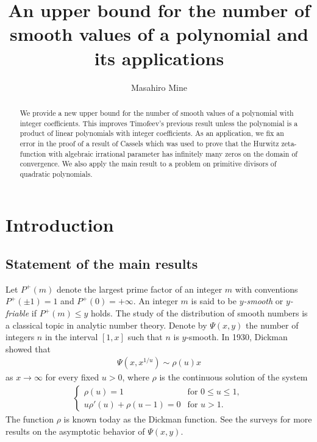 \documentclass[a4paper,11pt]{amsart}
\theoremstyle{definition}
\numberwithin{equation}{section}
\begin{document}
\title[Upper bound for the number of smooth values of a polynomial]
{An upper bound for the number of smooth values of a polynomial and its applications}

\author[M. Mine]{Masahiro Mine}
\address{Global Education Center\\ Waseda University\\
1-6-1 Nishiwaseda, Shinjuku-ku, Tokyo 169-8050, Japan}

\date{}

\begin{abstract}
We provide a new upper bound for the number of smooth values of a polynomial with integer coefficients. 
This improves Timofeev's previous result unless the polynomial is a product of linear polynomials with integer coefficients. 
As an application, we fix an error in the proof of a result of Cassels which was used to prove that the Hurwitz zeta-function with algebraic irrational parameter has infinitely many zeros on the domain of convergence. 
We also apply the main result to a problem on primitive divisors of quadratic polynomials. 
\end{abstract}



\maketitle

\section{Introduction}\label{sec:1}


\subsection{Statement of the main results}\label{sec:1.1}
Let $P^+(m)$ denote the largest prime factor of an integer $m$ with conventions $P^+(\pm1)=1$ and $P^+(0)=+\infty$. 
An integer $m$ is said to be \textit{$y$-smooth} or \textit{$y$-friable} if $P^+(m) \leq y$ holds. 
The study of the distribution of smooth numbers is a classical topic in analytic number theory. 
Denote by $\Psi(x,y)$ the number of integers $n$ in the interval $[1,x]$ such that $n$ is $y$-smooth. 
In 1930, Dickman \cite{Dickman1930} showed that 
\begin{align*}
\Psi(x,x^{1/u})
\sim \rho(u) x
\end{align*}
as $x \to\infty$ for every fixed $u>0$, where $\rho$ is the continuous solution of the system
\begin{align*}
\begin{cases}
\rho(u)=1
& \text{for $0 \leq u \leq 1$, }
\\
u\rho'(u)+\rho(u-1)=0
& \text{for $u>1$.}
\end{cases}
\end{align*}
The function $\rho$ is known today as the Dickman function. 
See the surveys \cite{Granville2008, HildebrandTenenbaum1993} for more results on the asymptotic behavior of $\Psi(x,y)$. 
\end{document}
